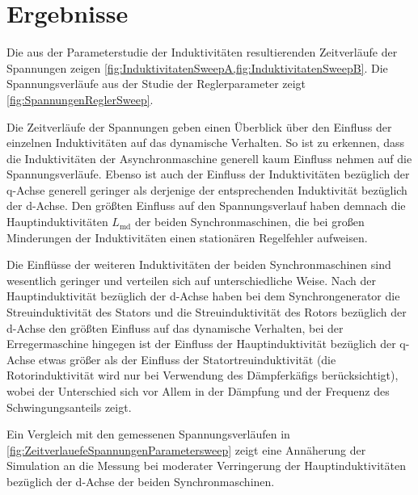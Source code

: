 \section{Ergebnisse}
Die aus der Parameterstudie der Induktivitäten resultierenden Zeitverläufe der Spannungen zeigen \cref{fig:InduktivitatenSweepA,fig:InduktivitatenSweepB}. Die Spannungsverläufe aus der Studie der Reglerparameter zeigt \cref{fig:SpannungenReglerSweep}.

Die Zeitverläufe der Spannungen geben einen Überblick über den Einfluss der einzelnen Induktivitäten auf das dynamische Verhalten. So ist zu erkennen, dass die Induktivitäten der Asynchronmaschine generell kaum Einfluss nehmen auf die Spannungsverläufe. Ebenso ist auch der Einfluss der Induktivitäten bezüglich der q-Achse generell geringer als derjenige der entsprechenden Induktivität bezüglich der d-Achse. Den größten Einfluss auf den Spannungsverlauf haben demnach die Hauptinduktivitäten $L_{\mathrm{md}}$ der beiden Synchronmaschinen, die bei großen Minderungen der Induktivitäten einen stationären Regelfehler aufweisen.

Die Einflüsse der weiteren Induktivitäten der beiden Synchronmaschinen sind wesentlich geringer und verteilen sich auf unterschiedliche Weise. Nach der Hauptinduktivität bezüglich der d-Achse haben bei dem Synchrongenerator die Streuinduktivität des Stators und die Streuinduktivität des Rotors  bezüglich der d-Achse den größten Einfluss auf das dynamische Verhalten, bei der Erregermaschine hingegen ist der Einfluss der Hauptinduktivität bezüglich der q-Achse etwas größer als der Einfluss der Statortreuinduktivität (die Rotorinduktivität wird nur bei Verwendung des Dämpferkäfigs berücksichtigt), wobei der Unterschied sich vor Allem in der Dämpfung und der Frequenz des Schwingungsanteils zeigt. 

Ein Vergleich mit den gemessenen Spannungsverläufen in \cref{fig:ZeitverlauefeSpannungenParametersweep} zeigt eine Annäherung der Simulation an die Messung bei moderater Verringerung der Hauptinduktivitäten bezüglich der d-Achse der beiden Synchronmaschinen.


